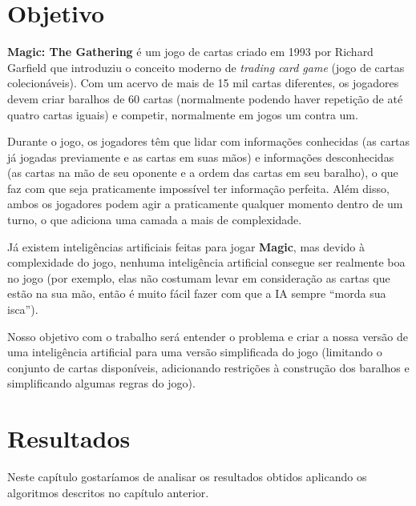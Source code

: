 \documentclass[dvipsnames]{book}
\begin{document}
\chapter*{Objetivo}
\textbf{Magic: The Gathering} é um jogo de cartas criado em 1993 por
Richard Garfield que introduziu o conceito moderno de \textit{trading
card game} (jogo de cartas colecionáveis). Com um acervo de mais de 15
mil cartas diferentes, os jogadores devem criar baralhos de 60 cartas
(normalmente podendo haver repetição de até quatro cartas iguais) e
competir, normalmente em jogos um contra um.
\par Durante o jogo, os jogadores têm que lidar com informações
conhecidas (as cartas já jogadas previamente e as cartas em suas mãos) e
informações desconhecidas (as cartas na mão de seu oponente e a ordem
das cartas em seu baralho), o que faz com que seja praticamente
impossível ter informação perfeita. Além disso, ambos os jogadores podem
agir a praticamente qualquer momento dentro de um turno, o que adiciona
uma camada a mais de complexidade.
\par Já existem inteligências artificiais feitas para jogar
\textbf{Magic}, mas devido à complexidade do jogo, nenhuma inteligência
artificial consegue ser realmente boa no jogo (por exemplo, elas não
costumam levar em consideração as cartas que estão na sua mão, então é
muito fácil fazer com que a IA sempre ``morda sua isca'').
\par Nosso objetivo com o trabalho será entender o problema e criar a
nossa versão de uma inteligência artificial para uma versão simplificada
do jogo (limitando o conjunto de cartas disponíveis, adicionando
restrições à construção dos baralhos e simplificando algumas regras do
jogo).







\newpage


\chapter{Resultados}
Neste capítulo gostaríamos de analisar os resultados obtidos aplicando os algoritmos descritos no
capítulo anterior.
\end{document}
